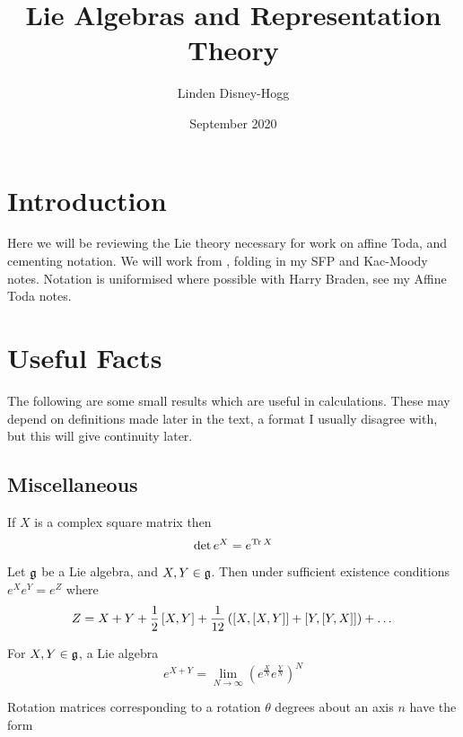 \documentclass{article}
\title{Lie Algebras and Representation Theory}
\author{Linden Disney-Hogg}
\date{September 2020}
\begin{document}
\maketitle
\tableofcontents

\section{Introduction}
Here we will be reviewing the Lie theory necessary for work on affine Toda, and cementing notation. We will work from \cite{Humphreys1978}, folding in my SFP and Kac-Moody notes. Notation is uniformised where possible with Harry Braden, see my Affine Toda notes. 



\section{Useful Facts}
The following are some small results which are useful in calculations. These may depend on definitions made later in the text, a format I usually disagree with, but this will give continuity later. 
\subsection{Miscellaneous}
\begin{theorem}
	If $X$ is a complex square matrix then 
	\[
	\det{e^X}=e^{\tr{X}}
	\]
\end{theorem}

\begin{theorem}
	Let $\mf{g}$ be a Lie algebra, and $X,Y\in\mf{g}$. Then under sufficient existence conditions $e^X e^Y=e^Z$ where
	\[
	Z=X+Y+\frac{1}{2}\comm[X]{Y}+\frac{1}{12}\left(\comm[X]{\comm[X]{Y}}+\comm[Y]{\comm[Y]{X}}\right)+\dots
	\]
\end{theorem}

\begin{corollary}
	For $X,Y\in\mf{g}$, a Lie algebra
	\[
	e^{X+Y}=\lim_{N\to\infty}\left( e^{\frac{X}{N}} e^{\frac{Y}{N}} \right)^N
	\]
\end{corollary}

\begin{fact}
	Rotation matrices corresponding to a rotation $\theta$ degrees about an axis $n$ have the form 
\end{fact}
\end{document}
